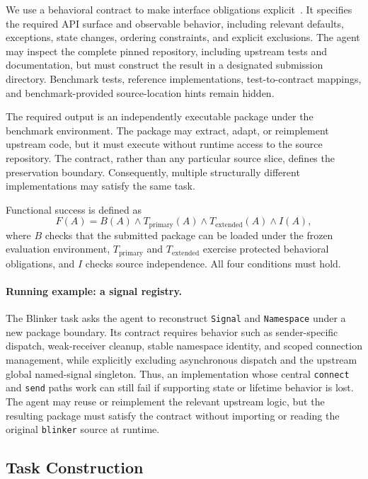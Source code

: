 \documentclass[acmsmall,screen,review,anonymous]{acmart}
\begin{document}
We use a behavioral contract to make interface obligations
explicit~\cite{meyer1992contract}. It specifies the required API surface and observable behavior,
including relevant defaults, exceptions, state changes, ordering constraints,
and explicit exclusions. The agent may inspect the complete pinned repository,
including upstream tests and documentation, but must construct the result in a
designated submission directory. Benchmark tests, reference implementations,
test-to-contract mappings, and benchmark-provided source-location hints remain
hidden.

The required output is an independently executable package under the benchmark
environment. The package may extract, adapt, or reimplement upstream code, but
it must execute without runtime access to the source repository. The contract,
rather than any particular source slice, defines the preservation boundary.
Consequently, multiple structurally different implementations may satisfy the
same task.

Functional success is defined as
\begin{equation}
  F(A)=B(A)\land T_{\mathrm{primary}}(A)
       \land T_{\mathrm{extended}}(A)\land I(A),
  \label{eq:functional}
\end{equation}
where $B$ checks that the submitted package can be loaded under the frozen
evaluation environment, $T_{\mathrm{primary}}$ and
$T_{\mathrm{extended}}$ exercise protected behavioral obligations, and $I$
checks source independence. All four conditions must hold.

\paragraph{Running example: a signal registry.}
The Blinker task asks the agent to reconstruct \texttt{Signal} and
\texttt{Namespace} under a new package boundary. Its contract requires behavior
such as sender-specific dispatch, weak-receiver cleanup, stable namespace
identity, and scoped connection management, while explicitly excluding
asynchronous dispatch and the upstream global named-signal singleton. Thus, an
implementation whose central \texttt{connect} and \texttt{send} paths work can
still fail if supporting state or lifetime behavior is lost. The agent may reuse
or reimplement the relevant upstream logic, but the resulting package must
satisfy the contract without importing or reading the original \texttt{blinker}
source at runtime.

\subsection{Task Construction}
\label{sec:construction}
\end{document}
